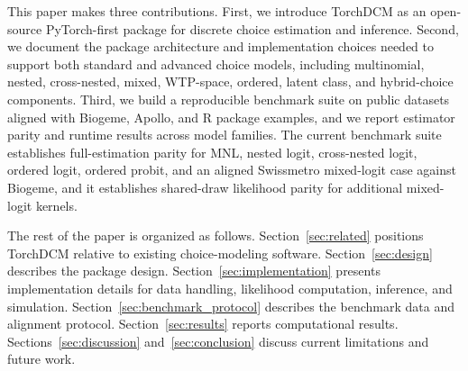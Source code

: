 This paper makes three contributions.
First, we introduce TorchDCM as an open-source PyTorch-first package for discrete choice estimation and inference.
Second, we document the package architecture and implementation choices needed to support both standard and advanced choice models, including multinomial, nested, cross-nested, mixed, WTP-space, ordered, latent class, and hybrid-choice components.
Third, we build a reproducible benchmark suite on public datasets aligned with Biogeme, Apollo, and R package examples, and we report estimator parity and runtime results across model families.
The current benchmark suite establishes full-estimation parity for MNL, nested logit, cross-nested logit, ordered logit, ordered probit, and an aligned Swissmetro mixed-logit case against Biogeme, and it establishes shared-draw likelihood parity for additional mixed-logit kernels.

The rest of the paper is organized as follows.
Section~\ref{sec:related} positions TorchDCM relative to existing choice-modeling software.
Section~\ref{sec:design} describes the package design.
Section~\ref{sec:implementation} presents implementation details for data handling, likelihood computation, inference, and simulation.
Section~\ref{sec:benchmark_protocol} describes the benchmark data and alignment protocol.
Section~\ref{sec:results} reports computational results.
Sections~\ref{sec:discussion} and~\ref{sec:conclusion} discuss current limitations and future work.
